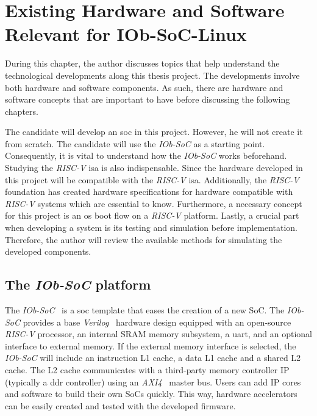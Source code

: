\chapter{Existing Hardware and Software Relevant for IOb-SoC-Linux}
\label{chapter:must_have_concepts}
During this chapter, the author discusses topics that help understand the technological developments along this thesis project. The developments involve both hardware and software components. As such, there are hardware and software concepts that are important to have before discussing the following chapters.

The candidate will develop an \acrshort{soc} in this project. However, he will not create it from scratch. The candidate will use the \textit{IOb-SoC} as a starting point. Consequently, it is vital to understand how the \textit{IOb-SoC} works beforehand. Studying the \textit{RISC-V} \acrfull{isa} is also indispensable. Since the hardware developed in this project will be compatible with the \textit{RISC-V} \acrshort{isa}. Additionally, the \textit{RISC-V} foundation has created hardware specifications for hardware compatible with \textit{RISC-V} systems which are essential to know. Furthermore, a necessary concept for this project is an \acrfull{os} boot flow on a \textit{RISC-V} platform. Lastly, a crucial part when developing a system is its testing and simulation before implementation. Therefore, the author will review the available methods for simulating the developed components.

\section{The \textit{IOb-SoC} platform}
\label{section:iob_soc_template}
The \textit{IOb-SoC}~\cite{iob_soc} is a \acrfull{soc} template that eases the creation of a new SoC. The \textit{IOb-SoC} provides a base \textit{Verilog}~\cite{thomas2008verilog} hardware design equipped with an open-source \textit{RISC-V} processor, an internal SRAM memory subsystem, a \acrshort{uart}, and an optional interface to external memory. If the external memory interface is selected, the \textit{IOb-SoC} will include an instruction L1 cache, a data L1 cache and a shared L2 cache. The L2 cache communicates with a third-party memory controller IP (typically a \acrshort{ddr} controller) using an \textit{AXI4}~\cite{tidala2018high} master bus. Users can add IP cores and software to build their own SoCs quickly. This way, hardware accelerators can be easily created and tested with the developed firmware.

